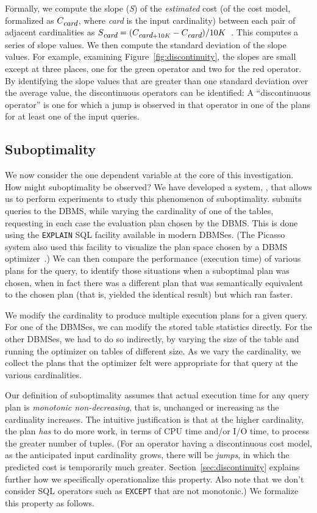 \documentclass[prodmode,acmtods]{acmsmall}
\def\azdb{\doubleblind{\hbox{\sc AZDBLab}}{\hbox{\sc DBLab}}}
\begin{document}
Formally, we compute the slope ({\em S}) of the {\em estimated} cost
(of the cost model, formalized as $C_{\hbox{\small\em card}}$,
where {\em card} is the input
cardinality) between each pair of adjacent cardinalities as
$S_{\hbox{\small\em card}} = (C_{\hbox{\small\em card} + 10K} -
C_{\hbox{\small\em card}}) / 10K$~.
This computes a series of slope values.
We then compute the standard deviation of the slope
values.  For example, examining Figure~\ref{fig:discontinuity}, the slopes
are small except at three places, one for the green operator and two for the
red operator. By identifying the slope values that are greater than one
standard deviation over the average value, the discontinuous operators can
be identified: A ``discontinuous operator'' is one for which a jump is
observed in that operator in one of the plans for at least one of the input
queries.

\subsection{Suboptimality}\label{sec:suboptimality}
We now consider the one dependent variable at the core of this investigation.
How might suboptimality be observed? We have developed a system, \azdb, that
allows us to perform experiments to study this phenomenon of suboptimality.
\hbox{\azdb} submits queries to the \hbox{DBMS}, while varying
the cardinality of one of the tables,
requesting in each case the evaluation plan chosen by the \hbox{DBMS}.
This is done using the
{\tt EXPLAIN} SQL facility available in modern \hbox{DBMSes}. (The Picasso system
also used this facility to visualize the plan space chosen by a \hbox{DBMS}
optimizer~\cite{harish07,Haritsa10}.) We can then compare
the performance (execution time) of various plans for the query, to identify those
situations when a suboptimal plan was chosen, when in fact there was a
different plan that was semantically equivalent to the chosen plan (that is,
yielded the identical result) but which ran faster.

We modify the cardinality to produce multiple execution plans for a given
query. For one of the \hbox{DBMSes}, we can modify the stored table
statistics directly. For the other \hbox{DBMSes}, we had to do so
indirectly, by varying the size of the table and running the optimizer on
tables of different size. As we vary the cardinality, we collect the plans
that the optimizer felt were appropriate for that query at the various cardinalities.

Our definition of suboptimality assumes that
actual execution time for any query plan is {\em monotonic non-decreasing}, that is,
unchanged or increasing as the cardinality increases.  The intuitive justification is that at the higher
cardinality, the plan {\em has} to do more work, in terms of CPU time and/or
I/O time, to process the greater number of tuples. (For an operator having a discontinuous cost model, as the
anticipated input cardinality grows, there will be {\em jumps}, in which the
predicted cost is temporarily much greater. Section~\ref{sec:discontinuity}
explains further how we specifically
operationalize this property. Also note that we don't consider SQL
operators such as {\tt EXCEPT} that are not monotonic.)
We formalize this property as follows.
\end{document}
